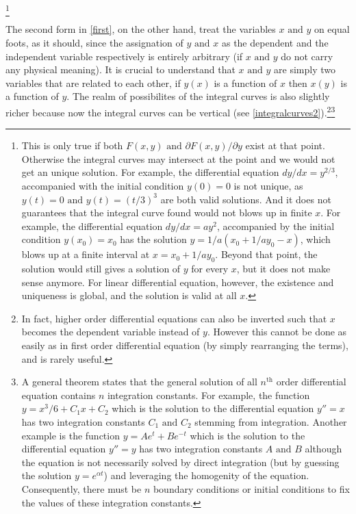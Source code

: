 \documentclass[english,a4paper,12pt]{report}
\begin{document}

\footnote{This is only true if both \(F(x,y) \text { and } \partial F(x,y)/\partial y \) exist at that point. Otherwise the integral curves may intersect at the point and we would not get an unique solution. For example, the differential equation \(dy /dx = y^{2 /3 } \), accompanied with the initial condition \(y(0) = 0\) is not unique, as \(y(t) = 0 \text { and } y(t) = (t /3 )^3 \) are both valid solutions. And it does not guarantees that the integral curve found would not blows up in finite \(x\). For example, the differential equation \(dy /dx = ay^2 \), accompanied by the initial condition \(y(x_0 )= x_0 \) has the solution \(y = 1 /a(x_0 +1 /ay_0 -x ) \), which blows up at a finite interval at \(x = x_0 + 1/ay_0 \). Beyond that point, the solution would still gives a solution of \(y\) for every \(x\), but it does not make sense anymore. For linear differential equation, however, the existence and uniqueness is global, and the solution is valid at all \(x\).} 

The second form in \cref{first}, on the other hand, treat the variables \(x \text { and } y\) on equal foots, as it should, since the assignation of \(y \text { and } x\) as the dependent and the independent variable respectively is entirely arbitrary (if \(x \text { and } y\) do not carry any physical meaning). It is crucial to understand that \(x \text { and } y\) are simply two variables that are related to each other, if \(y(x)\) is a function of \(x\) then \(x(y)\) is a function of \(y\). The realm of possibilites of the integral curves is also slightly richer because now the integral curves can be vertical (see \cref{integralcurves2}).\footnote{In fact, higher order differential equations can also be inverted such that \(x\) becomes the dependent variable instead of \(y\). However this cannot be done as easily as in first order differential equation (by simply rearranging the terms), and is rarely useful.}\footnote{A general theorem states that the general solution of all \(n^{\text{th}} \) order differential equation contains \(n\) integration constants. For example, the function \(y=x^3 /6 + C_1 x + C_2 \) which is the solution to the differential equation \(y'' = x\) has two integration constants \(C_1 \text { and } C_2 \) stemming from integration. Another example is the function \(y = Ae^{ t} + Be^{- t}  \) which is the solution to the differential equation \(y'' = y\) has two integration constants \(A\text { and } B\) although the equation is not necessarily solved by direct integration (but by guessing the solution \(y=e^{\alpha t} \)) and leveraging the homogenity of the equation. Consequently, there must be \(n\) boundary conditions or initial conditions to fix the values of these integration constants.}
\end{document}
